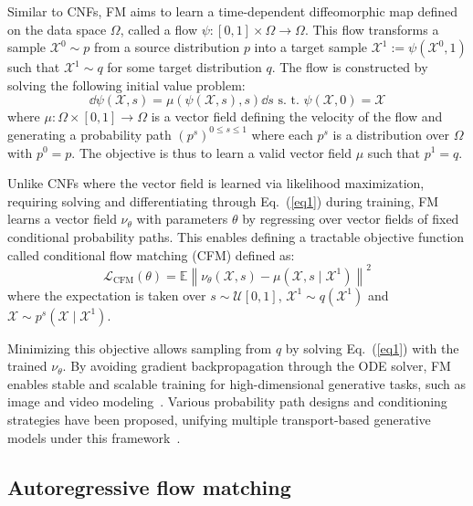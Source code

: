 \documentclass[a4paper,10pt,twocolumn,preprint,3p]{elsarticle}
\begin{document}
Similar to CNFs, FM aims to learn a time-dependent diffeomorphic map defined on the data space $\Omega$, called a flow $\psi \colon [0, 1] \times \Omega \to \Omega$.
This flow transforms a sample $\mathcal{X}^0 \sim p$ from a source distribution $p$ into a target sample $\mathcal{X}^1 := \psi(\mathcal{X}^0, 1)$ such that $\mathcal{X}^1 \sim q$ for some target distribution $q$. The flow is constructed by solving the following initial value problem:
\begin{equation}\label{eq1}
    \dd \psi(\mathcal{X}, s
) = \mu(\psi(\mathcal{X},s
),s) \dd s \text{ s.~t. } \psi(\mathcal{X},0
) = \mathcal{X} %
\end{equation}
where $\mu \colon \Omega \times [0, 1] \to \Omega$ is a vector field defining the velocity of the flow and generating a probability path $(p^s)^{0 \leq s \leq 1}$ where each $p^s$ is a distribution over $\Omega$ with $p^0 = p$. The objective is thus to learn a valid vector field $\mu$ such that $p^1 = q$.

Unlike CNFs where the vector field is learned via likelihood maximization, requiring solving and differentiating through Eq.~(\ref{eq1}) during training, FM learns a vector field $\nu_\theta$ with parameters $\theta$ by regressing over vector fields of fixed conditional probability paths. 
This enables defining a tractable objective function called conditional flow matching (CFM) defined as:
\begin{equation}\label{eq:cfm}
\mathcal{L}_{\text{CFM}}(\theta) = \mathbb{E} \left\| \nu_{\theta}(\mathcal{X}, s) - \mu(\mathcal{X}, s\mid \mathcal{X}^1)\right\|^2
\end{equation}
where the expectation is taken over $s \sim \mathcal{U}[0, 1]$, $ \mathcal{X}^1 \sim q(\mathcal{X}^1)$ and $\mathcal{X} \sim p^s(\mathcal{X} \mid \mathcal{X}^1)$.

Minimizing this objective allows sampling from $q$ by solving Eq.~(\ref{eq1}) with the trained $\nu_\theta$. By avoiding gradient backpropagation through the ODE solver, FM enables stable and scalable training for high-dimensional generative tasks, such as image and video modeling~\citep{esser2024scaling, polyak2024movie}. Various probability path designs and conditioning strategies have been proposed, unifying multiple transport-based generative models under this framework~\citep{liu2022flow, albergo2023stochastic, tong2023improving}.

\subsection{Autoregressive flow matching}
\label{sec:AFM}
\end{document}
